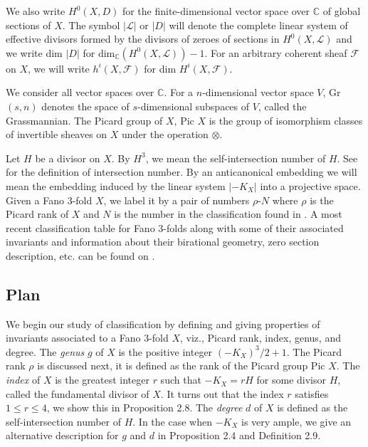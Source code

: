 \documentclass[11pt]{amsart}
\theoremstyle{plain}
\theoremstyle{definition}
\theoremstyle{expl}
\begin{document}
We also write $H^0(X,D)$ for the finite-dimensional vector space over $\mathbb{C}$ of global sections of $X$.
The symbol $|\mathcal{L}|$ or $|D|$ will denote the complete linear system of effective divisors formed by the divisors of zeroes of sections in $H^0(X,\mathcal{L})$ and we write dim $|D|$ for dim$_{\mathbb{C}}(H^0(X,\mathcal{L})) -1$.
For an arbitrary coherent sheaf $\mathcal{F}$ on $X$, we will write $h^i(X,\mathcal{F})$ for dim $H^i(X,\mathcal{F})$. 

We consider all vector spaces over $\mathbb{C}$. For a $n$-dimensional vector space $V$, Gr$(s,n)$ denotes the space of $s$-dimensional subspaces of $V$, called the Grassmannian. The Picard group of $X$, Pic $X$ is the group of isomorphism classes of invertible sheaves on $X$ under the operation $\otimes$. 

Let $H$ be a divisor on $X$. By $H^3$, we mean the self-intersection number of $H$. See \cite[1.2]{3264} for the definition of intersection number. 
By an anticanonical embedding we will mean the embedding induced by the linear system $|-K_X|$ into a projective space.
\medbreak 
Given a Fano $3$-fold $X$, we label it by a pair of numbers $\rho$-$N$ where $\rho$ is the Picard rank of $X$ and $N$ is the number in the classification found in \cite{FanoV}. A most recent classification table for Fano $3$-folds along with some of their associated invariants and information about their birational geometry, zero section description, etc. can be found on \cite{Fano}.

\subsection{Plan} We begin our study of classification by defining and giving properties of invariants associated to a Fano $3$-fold $X$, viz., Picard rank, index, genus, and degree. The \textit{genus} $g$ of $X$ is the positive integer $(-K_X)^3/2 +1$. The Picard rank $\rho$ is discussed next, it is defined as the rank of the Picard group Pic $X$. The \textit{index} of $X$ is the greatest integer $r$ such that $-K_X = rH$ for some divisor $H$, called the fundamental divisor of $X$. It turns out that the index $r$ satisfies $1 \leq r \leq 4$, we show this in Proposition 2.8. The \textit{degree} $d$ of $X$ is defined as the self-intersection number of $H$. In the case when $-K_X$ is very ample, we give an alternative description for $g$ and $d$ in Proposition 2.4 and Definition 2.9. 
\end{document}
